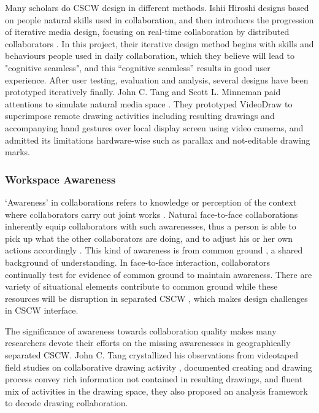 \documentclass[12pt,twoside]{article}
\begin{document}
Many scholars do CSCW design in different methods. Ishii Hiroshi designs based on people natural skills used in collaboration, and then introduces the progression of iterative media design, focusing on real-time collaboration by distributed collaborators \cite{ishii1992clearboard}\cite{ishii1993integration}\cite{ishii1994iterative}. In this project, their iterative design method begins with skills and behaviours people used in daily collaboration, which they believe will lead to "cognitive seamless", and this “cognitive seamless” results in good user experience. After user testing, evaluation and analysis, several designs have been prototyped iteratively finally. John C. Tang and Scott L. Minneman paid attentions to simulate natural media space \cite{tang1991videodraw}. They prototyped VideoDraw to superimpose remote drawing activities including resulting drawings and accompanying hand gestures over local display screen using video cameras, and admitted its limitations hardware-wise such as parallax and not-editable drawing marks.  


\subsubsection{Workspace Awareness}
‘Awareness’ in collaborations refers to knowledge or perception of  the context where collaborators carry out joint works \cite{gellersen2002multi}. Natural face-to-face collaborations inherently equip collaborators with such awarenesses, thus a person is able to pick up what the other collaborators are doing, and to adjust his or her own actions accordingly \cite{gutwin2002descriptive}. This kind of awareness is from common ground \cite{clark1996using}, a shared background of understanding. In face-to-face interaction, collaborators continually test for evidence of common ground to maintain awareness. There are variety of situational elements contribute to common ground while these resources will be disruption in separated CSCW \cite{tang1991findings}, which makes design challenges in CSCW interface. 

The significance of awareness towards collaboration quality makes many researchers devote their efforts on the missing awarenesses in geographically separated CSCW. John C. Tang crystallized his observations from videotaped field studies on collaborative drawing activity \cite{tang1991findings}, documented creating and drawing process convey rich information not contained in resulting drawings, and fluent mix of activities in the drawing space, they also proposed an analysis framework to decode drawing collaboration.
\end{document}
